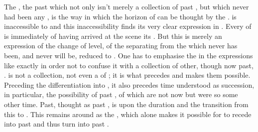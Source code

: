 \pa\label{pa:purepast} The , the past which not only isn't merely
a collection of past , but which never had been any 
, is the way in which the horizon of  can be
thought by the .  is
inaccessible to  and this inaccessibility finds its very clear
expression in . Every  of  is immediately
 of having arrived at the scene  its . But this
 is merely an expression of the change of level, of the 
separating  from the  which never has been, and
never will be, reduced to . One has to emphasise the
 in the expressions like  exactly in order not to
confuse it with a collection of other, though now past, .
 is not a collection, not even a  of
; it is what precedes  and makes them possible.
Preceding the differentiation into , it also precedes time
understood as succession, in particular, the possibility of past
, of  which are not  now but were so
some other time.  Past, thought as past , is  upon
the  duration and the transition from this  to
. This  remains around  as the
, which alone makes it possible for  to
recede into past and thus turn into past .

